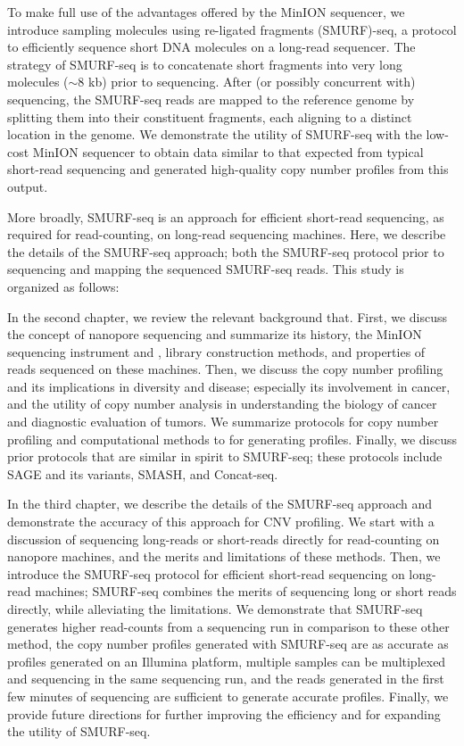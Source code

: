 To make full use of the advantages offered by the MinION sequencer, we
introduce sampling molecules using re-ligated fragments (SMURF)-seq, a
protocol to efficiently sequence short DNA molecules on a long-read
sequencer. The strategy of SMURF-seq is to concatenate short fragments
into very long molecules ($\sim$8 kb) prior to sequencing. After (or
possibly concurrent with) sequencing, the SMURF-seq reads are mapped to
the reference genome by splitting them into their constituent fragments,
each aligning to a distinct location in the genome.
%
We demonstrate the utility of SMURF-seq with the low-cost MinION
sequencer to obtain data similar to that expected from typical
short-read sequencing and generated high-quality copy number profiles
from this output.

More broadly, SMURF-seq is an approach for efficient short-read
sequencing, as required for read-counting, on long-read sequencing
machines. Here, we describe the details of the SMURF-seq approach; both
the SMURF-seq protocol prior to sequencing and mapping the sequenced
SMURF-seq reads. This study is organized as follows:

In the second chapter, we review the relevant background that.
First, we discuss the concept of nanopore sequencing and summarize its
history, the MinION sequencing instrument and , library construction
methods, and properties of reads sequenced on these machines.
%
Then, we discuss the copy number profiling and its implications in
diversity and disease; especially its involvement in cancer, and the
utility of copy number analysis in understanding the biology of cancer
and diagnostic evaluation of tumors. We summarize protocols for copy
number profiling and computational methods to for generating profiles.
%
Finally, we discuss prior protocols that are similar in spirit to
SMURF-seq; these protocols include SAGE and its variants, SMASH, and
Concat-seq.

In the third chapter, we describe the details of the SMURF-seq approach
and demonstrate the accuracy of this approach for CNV profiling.
We start with a discussion of sequencing long-reads or short-reads
directly for read-counting on nanopore machines, and the merits and
limitations of these methods.
%
Then, we introduce the SMURF-seq protocol for efficient short-read
sequencing on long-read machines; SMURF-seq combines the merits of
sequencing long or short reads directly, while alleviating the
limitations.
%
We demonstrate that SMURF-seq generates higher read-counts from a
sequencing run in comparison to these other method, the copy number
profiles generated with SMURF-seq are as accurate as profiles generated
on an Illumina platform, multiple samples can be multiplexed and
sequencing in the same sequencing run, and the reads generated in the
first few minutes of sequencing are sufficient to generate accurate
profiles.
%
Finally, we provide future directions for further improving the
efficiency and for expanding the utility of SMURF-seq.

